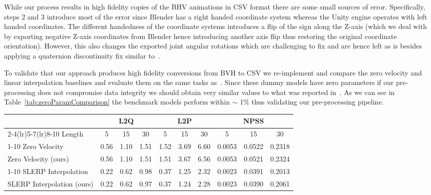 \documentclass[letterpaper]{article} \usepackage[]{aaai23}  \usepackage{times}  \usepackage{helvet}  \usepackage{courier}  \usepackage[hyphens]{url}  \usepackage{graphicx} \urlstyle{rm} \def\UrlFont{\rm}  \usepackage{natbib}  \usepackage{caption} \frenchspacing  \setlength{\pdfpagewidth}{8.5in} \setlength{\pdfpageheight}{11in}
\begin{document}
While our process results in high fidelity copies of the BHV animations in CSV format there are some small sources of error.
Specifically, steps 2 and 3 introduce most of the error since Blender has a right handed coordinate system whereas the Unity engine operates with left handed coordinates. The different handedness of the coordinate systems introduces a flip of the sign along the Z-axis (which we deal with by exporting negative Z-axis coordinates from Blender hence introducing another axis flip thus restoring the original coordinate orientation). However, this also changes the exported joint angular rotations which are challenging to fix and are hence left as is besides applying a quaternion discontinuity fix similar to~\cite{harvey2020robust}.

To validate that our approach produces high fidelity conversions from BVH to CSV we re-implement and compare the zero velocity and linear interpolation baselines and evaluate them on the same tasks as~\cite{harvey2020robust}. 
Since these dummy models have zero parameters if our pre-processing does not compromise data integrity we should obtain very similar values to what was reported in~\cite{harvey2020robust}.
As we can see in Table~\ref{tab:zeroParamComparison} the benchmark models perform within $\sim$ 1\% thus validating our pre-processing pipeline.

\begin{table*}[!ht]
\centering
\caption{Comparison of zero parameter models to verify data integrity of LaFAN1 benchmark.}
\begin{tabularx}{\textwidth}{l@{\extracolsep{\fill}} ccccccccc}
&\multicolumn{3}{c}{\textbf{L2Q}} &\multicolumn{3}{c}{\textbf{L2P}} &\multicolumn{3}{c}{\textbf{NPSS}} \\
\cmidrule(lr){2-4}\cmidrule(lr){5-7}\cmidrule(lr){8-10}
Length & 5 & 15 & 30 & 5 & 15 & 30 & 5 & 15 & 30\\
\cmidrule(lr){1-10}
Zero Velocity~\cite{harvey2020robust} & 0.56 & 1.10 & 1.51 & 1.52 & 3.69 & 6.60 & 0.0053 & 0.0522 & 0.2318 \\
Zero Velocity (ours) & 0.56 & 1.10 & 1.51 & 1.51 & 3.67 & 6.56 & 0.0053 & 0.0521 & 0.2324 \\
\cmidrule(lr){1-10}
SLERP Interpolation~\cite{harvey2020robust} & 0.22 & 0.62 & 0.98 & 0.37 & 1.25 & 2.32 & 0.0023 & 0.0391 & 0.2013 \\
SLERP Interpolation (ours) & 0.22 & 0.62 & 0.97 & 0.37 & 1.24 & 2.28 & 0.0023 & 0.0390 & 0.2061 \\
\end{tabularx}\label{tab:zeroParamComparison}
\end{table*}
\end{document}
